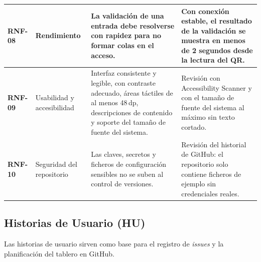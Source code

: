 \documentclass[11pt,a4paper]{article}
\begin{document}
\begin{longtable}{L{1.7cm} L{2.4cm} L{6.0cm} L{4.0cm}}
\midrule
\textbf{RNF-08} & Rendimiento & La validación de una entrada debe resolverse con rapidez para no formar colas en el acceso. & Con conexión estable, el resultado de la validación se muestra en menos de 2 segundos desde la lectura del QR. \\
\midrule
\textbf{RNF-09} & Usabilidad y accesibilidad & Interfaz consistente y legible, con contraste adecuado, áreas táctiles de al menos 48\,dp, descripciones de contenido y soporte del tamaño de fuente del sistema. & Revisión con Accessibility Scanner y con el tamaño de fuente del sistema al máximo sin texto cortado. \\
\midrule
\textbf{RNF-10} & Seguridad del repositorio & Las claves, secretos y ficheros de configuración sensibles no se suben al control de versiones. & Revisión del historial de GitHub: el repositorio solo contiene ficheros de ejemplo sin credenciales reales. \\
\end{longtable}

\subsection{Historias de Usuario (HU)}
Las historias de usuario sirven como base para el registro de \textit{issues} y la planificación del tablero en GitHub.
\end{document}
